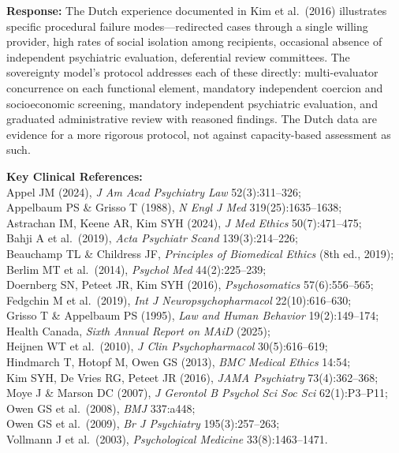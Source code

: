 \documentclass[11pt, letterpaper]{article}
\begin{document}
\medskip

\begin{objectionbox}[title={\sffamily\bfseries\small\color{C@warning}
  ``The Dutch experience shows capacity-based regimes fail''}]
\textbf{Response:} The Dutch experience documented in Kim et al.\ (2016) illustrates
specific procedural failure modes---redirected cases through a single willing provider,
high rates of social isolation among recipients, occasional absence of independent
psychiatric evaluation, deferential review committees. The sovereignty model's protocol
addresses each of these directly: multi-evaluator concurrence on each functional
element, mandatory independent coercion and socioeconomic screening, mandatory
independent psychiatric evaluation, and graduated administrative review with reasoned
findings. The Dutch data are evidence for a more rigorous protocol, not against
capacity-based assessment as such.
\end{objectionbox}

\bigskip
{\small\sffamily\color{C@midgray}
\textbf{Key Clinical References:}\\
Appel JM (2024), \textit{J Am Acad Psychiatry Law} 52(3):311--326;\\
Appelbaum PS \& Grisso T (1988), \textit{N Engl J Med} 319(25):1635--1638;\\
Astrachan IM, Keene AR, Kim SYH (2024), \textit{J Med Ethics} 50(7):471--475;\\
Bahji A et al.\ (2019), \textit{Acta Psychiatr Scand} 139(3):214--226;\\
Beauchamp TL \& Childress JF, \textit{Principles of Biomedical Ethics} (8th ed., 2019);\\
Berlim MT et al.\ (2014), \textit{Psychol Med} 44(2):225--239;\\
Doernberg SN, Peteet JR, Kim SYH (2016), \textit{Psychosomatics} 57(6):556--565;\\
Fedgchin M et al.\ (2019), \textit{Int J Neuropsychopharmacol} 22(10):616--630;\\
Grisso T \& Appelbaum PS (1995), \textit{Law and Human Behavior} 19(2):149--174;\\
Health Canada, \textit{Sixth Annual Report on MAiD} (2025);\\
Heijnen WT et al.\ (2010), \textit{J Clin Psychopharmacol} 30(5):616--619;\\
Hindmarch T, Hotopf M, Owen GS (2013), \textit{BMC Medical Ethics} 14:54;\\
Kim SYH, De Vries RG, Peteet JR (2016), \textit{JAMA Psychiatry} 73(4):362--368;\\
Moye J \& Marson DC (2007), \textit{J Gerontol B Psychol Sci Soc Sci} 62(1):P3--P11;\\
Owen GS et al.\ (2008), \textit{BMJ} 337:a448;\\
Owen GS et al.\ (2009), \textit{Br J Psychiatry} 195(3):257--263;\\
Vollmann J et al.\ (2003), \textit{Psychological Medicine} 33(8):1463--1471.
}
\end{document}
